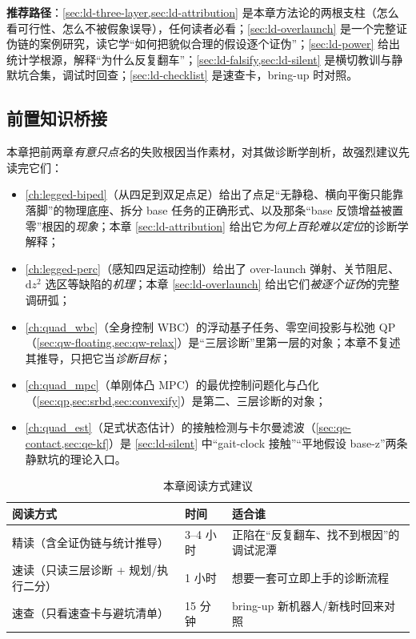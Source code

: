 \noindent\textbf{推荐路径}：\cref{sec:ld-three-layer,sec:ld-attribution} 是本章方法论的两根支柱（怎么看可行性、怎么不被假象误导），任何读者必看；\cref{sec:ld-overlaunch} 是一个完整证伪链的案例研究，读它学“如何把貌似合理的假设逐个证伪”；\cref{sec:ld-power} 给出统计学根源，解释“为什么反复翻车”；\cref{sec:ld-falsify,sec:ld-silent} 是横切教训与静默坑合集，调试时回查；\cref{sec:ld-checklist} 是速查卡，bring-up 时对照。

\subsection*{前置知识桥接}
本章把前两章\emph{有意只点名}的失败根因当作素材，对其做诊断学剖析，故强烈建议先读完它们：
\begin{itemize}
  \item \cref{ch:legged-biped}（从四足到双足点足）给出了点足“无静稳、横向平衡只能靠落脚”的物理底座、拆分 base 任务的正确形式、以及那条“base 反馈增益被置零”根因的\emph{现象}；本章 \cref{sec:ld-attribution} 给出它\emph{为何上百轮难以定位}的诊断学解释；
  \item \cref{ch:legged-perc}（感知四足运动控制）给出了 over-launch 弹射、关节阻尼、$\mathrm{d}z^2$ 选区等缺陷的\emph{机理}；本章 \cref{sec:ld-overlaunch} 给出它们\emph{被逐个证伪}的完整调研弧；
  \item \cref{ch:quad_wbc}（全身控制 WBC）的浮动基子任务、零空间投影与松弛 QP（\cref{sec:qw-floating,sec:qw-relax}）是“三层诊断”里第一层的对象；本章不复述其推导，只把它当\emph{诊断目标}；
  \item \cref{ch:quad_mpc}（单刚体凸 MPC）的最优控制问题化与凸化（\cref{sec:qp,sec:srbd,sec:convexify}）是第二、三层诊断的对象；
  \item \cref{ch:quad_est}（足式状态估计）的接触检测与卡尔曼滤波（\cref{sec:qe-contact,sec:qe-kf}）是 \cref{sec:ld-silent} 中“gait-clock 接触”“平地假设 base-z”两条静默坑的理论入口。
\end{itemize}

\begin{table}[H]\centering\small
\caption{本章阅读方式建议}
\begin{tabular}{lll}
\toprule
阅读方式 & 时间 & 适合谁 \\
\midrule
精读（含全证伪链与统计推导） & 3--4 小时 & 正陷在“反复翻车、找不到根因”的调试泥潭 \\
速读（只读三层诊断 + 规划/执行二分） & 1 小时 & 想要一套可立即上手的诊断流程 \\
速查（只看速查卡与避坑清单） & 15 分钟 & bring-up 新机器人/新栈时回来对照 \\
\bottomrule
\end{tabular}
\end{table}

